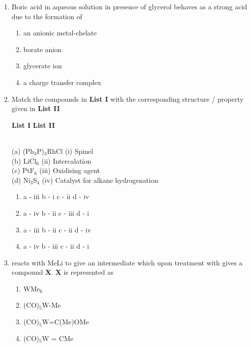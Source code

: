 \documentclass[journal,12pt,onecolumn]{IEEEtran}
\theoremstyle{remark}
\begin{document}
\begin{enumerate}
\item Boric acid in aqueous solution in presence of glycerol behaves as a strong acid due to the formation of \hfill{}
\begin{multicols}{2}
\begin{enumerate}[leftmargin=*,labelsep=1em]
     \item   an anionic metal-chelate
     \item   borate anion
     \item   glycerate ion
     \item   a charge transfer complex
\end{enumerate}
\end{multicols}
 

\item Match the compounds in \textbf{List I} with the corresponding structure / property given in \textbf{List II} \hfill{}

\begin{tabbing}
\hspace{3cm} \= \textbf{List I} \hspace{5cm} \= \textbf{List II}

\\
(a) (Ph$_3$P)$_3$RhCl \> (i) Spinel \\
(b) LiCl$_6$ \> (ii) Intercalation \\
(c) PtF$_6$ \> (iii) Oxidising agent \\
(d) Ni$_3$S$_4$ \> (iv) Catalyst for alkane hydrogenation \\

\end{tabbing}


\begin{enumerate}[leftmargin=*,labelsep=1em]
     \item   a - iii \quad b - i \quad c - ii \quad d - iv
     \item   a - iv \quad b - ii \quad c - iii \quad d - i
     \item   a - iii \quad b - ii \quad c - ii \quad d - iv
     \item   a - iv \quad b - iii \quad c - ii \quad d - i
\end{enumerate}

 

\item {} reacts with MeLi to give an intermediate which upon treatment with  gives a compound \textbf{X}. \textbf{X} is represented as \hfill{}
\begin{multicols}{2}
\begin{enumerate}[leftmargin=*,labelsep=1em]
     \item   WMe$_6$
     \item   (CO)$_5$W-Me
     \item   (CO)$_5$W=C(Me)OMe
     \item   (CO)$_5$W = CMe
\end{enumerate}
\end{multicols}
 


\end{enumerate}
\end{document}
